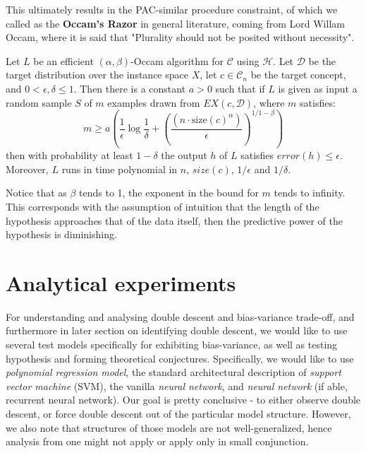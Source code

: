 \documentclass{article}
\begin{document}
This ultimately results in the PAC-similar procedure constraint, of which we called as the \textbf{Occam's Razor} in general literature, coming from Lord Willam Occam, where it is said that "Plurality should not be posited without necessity". 
\begin{theorem}\label{eq:Occam1}
    Let $L$ be an efficient $(\alpha,\beta)$-Occam algorithm for $\mathcal{C}$ using $\mathcal{H}$. Let $\mathcal{D}$ be the target distribution over the instance space $X$, let $c\in \mathcal{C}_{n}$ be the target concept, and $0< \epsilon, \delta \leq 1$. Then there is a constant $a>0$ such that if $L$ is given as input a random sample $S$ of $m$ examples drawn from $EX(c,\mathcal{D})$, where $m$ satisfies: 
    \begin{equation}
        m \geq a \left( \frac{1}{\epsilon} \log{\frac{1}{\delta}} + \left(\frac{(n\cdot \mathrm{size}(c)^{\alpha})}{\epsilon}\right)^{1/1-\beta} \right)
    \end{equation}
    then with probability at least $1-\delta$ the output $h$ of $L$ satisfies $error(h)\leq \epsilon$. Moreover, $L$ runs in time polynomial in $n$, $size(c)$, $1/\epsilon$ and $1/\delta$.
\end{theorem}
Notice that as $\beta$ tends to 1, the exponent in the bound for $m$ tends to infinity. This corresponds with the assumption of intuition that the length of the hypothesis approaches that of the data itself, then the predictive power of the hypothesis is diminishing. 

\clearpage

\section{Analytical experiments}
For understanding and analysing double descent and bias-variance trade-off, and furthermore in later section on identifying double descent, we would like to use several test models specifically for exhibiting bias-variance, as well as testing hypothesis and forming theoretical conjectures. Specifically, we would like to use \textit{polynomial regression model}, the standard architectural description of \textit{support vector machine} (SVM), the vanilla \textit{neural network}, and \textit{neural network} (if able, recurrent neural network). Our goal is pretty conclusive - to either observe double descent, or force double descent out of the particular model structure. However, we also note that structures of those models are not well-generalized, hence analysis from one might not apply or apply only in small conjunction. 
\end{document}
